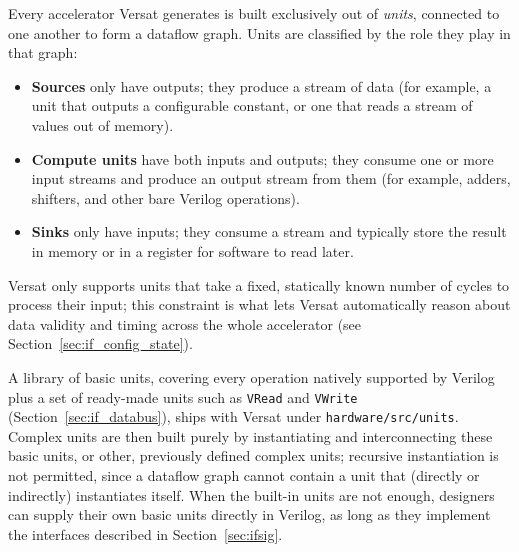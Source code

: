 %

Every accelerator Versat generates is built exclusively out of \emph{units},
connected to one another to form a dataflow graph. Units are classified by
the role they play in that graph:

\begin{itemize}
  \itemsep-0.5em
  \item \textbf{Sources} only have outputs; they produce a stream of data
    (for example, a unit that outputs a configurable constant, or one that
    reads a stream of values out of memory).
  \item \textbf{Compute units} have both inputs and outputs; they consume
    one or more input streams and produce an output stream from them (for
    example, adders, shifters, and other bare Verilog operations).
  \item \textbf{Sinks} only have inputs; they consume a stream and
    typically store the result in memory or in a register for software to
    read later.
\end{itemize}

Versat only supports units that take a fixed, statically known number of
cycles to process their input; this constraint is what lets Versat
automatically reason about data validity and timing across the whole
accelerator (see Section~\ref{sec:if_config_state}).

A library of basic units, covering every operation natively supported by
Verilog plus a set of ready-made units such as \texttt{VRead} and
\texttt{VWrite} (Section~\ref{sec:if_databus}), ships with Versat under
\texttt{hardware/src/units}. Complex units are then built purely by
instantiating and interconnecting these basic units, or other, previously
defined complex units; recursive instantiation is not permitted, since a
dataflow graph cannot contain a unit that (directly or indirectly)
instantiates itself. When the built-in units are not enough, designers can
supply their own basic units directly in Verilog, as long as they
implement the interfaces described in Section~\ref{sec:ifsig}.
